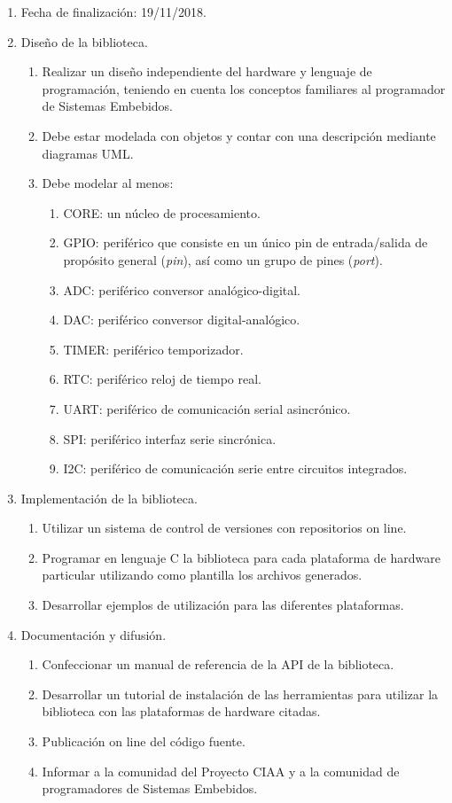 \begin{enumerate}
\item Fecha de finalización: 19/11/2018.
\item Diseño de la biblioteca.
\begin{enumerate}%
\item Realizar un diseño independiente del hardware y lenguaje de programación, teniendo en cuenta los conceptos familiares al programador de Sistemas Embebidos.
\item Debe estar modelada con objetos y contar con una descripción mediante diagramas UML.
\item Debe modelar al menos:
\begin{enumerate}
\item CORE: un núcleo de procesamiento.
\item GPIO: periférico que consiste en un único pin de entrada/salida de propósito general (\emph{pin}), así como un grupo de pines (\emph{port}).
\item ADC: periférico conversor analógico-digital.
\item DAC: periférico conversor digital-analógico.
\item TIMER: periférico temporizador.
\item RTC: periférico reloj de tiempo real.
\item UART: periférico de comunicación serial asincrónico.
\item SPI: periférico interfaz serie sincrónica.
\item I2C: periférico de comunicación serie entre circuitos integrados.
\end{enumerate}
\end{enumerate}
\item Implementación de la biblioteca.
\begin{enumerate}
\item Utilizar un sistema de control de versiones con repositorios on line.
\item Programar en lenguaje C la biblioteca para cada plataforma de hardware particular utilizando como plantilla los archivos generados.
\item Desarrollar ejemplos de utilización para las diferentes plataformas.
\end{enumerate}
\item Documentación y difusión.
\begin{enumerate}
\item Confeccionar un manual de referencia de la API de la biblioteca.
\item Desarrollar un tutorial de instalación de las herramientas para utilizar la biblioteca con las plataformas de hardware citadas.
\item Publicación on line del código fuente.
\item Informar a la comunidad del Proyecto CIAA y a la comunidad de programadores de Sistemas Embebidos.
\end{enumerate}
\end{enumerate}


